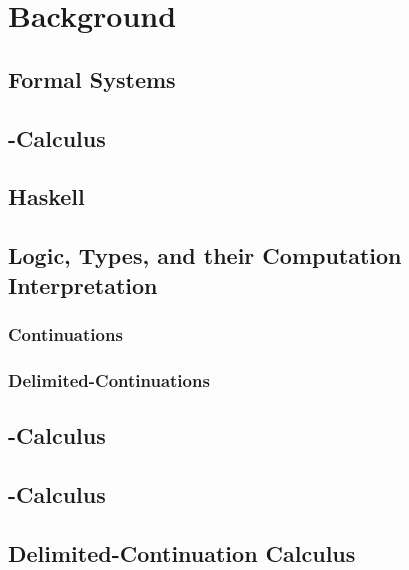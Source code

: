 \chapter{Background}

\section{Formal Systems}

\section{\lam-Calculus}

\section{Haskell}

\section{Logic, Types, and their Computation Interpretation}
\subsection{Continuations}
\subsection{Delimited-Continuations}

\section{\lmu-Calculus}

\section{\ltry-Calculus}

\section{Delimited-Continuation Calculus}
